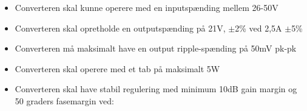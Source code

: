\begin{itemize}
	\item Converteren skal kunne operere med en inputspænding mellem 26-50V
	\item Converteren skal opretholde en outputspænding på 21V, $\pm$2\% ved 2,5A $\pm$5\%
	\item Converteren må maksimalt have en output ripple-spænding på 50mV pk-pk
	\item Converteren skal operere med et tab på maksimalt 5W %
	\item Converteren skal have stabil regulering med minimum 10dB gain margin og 50 graders fasemargin ved:
\end{itemize}
